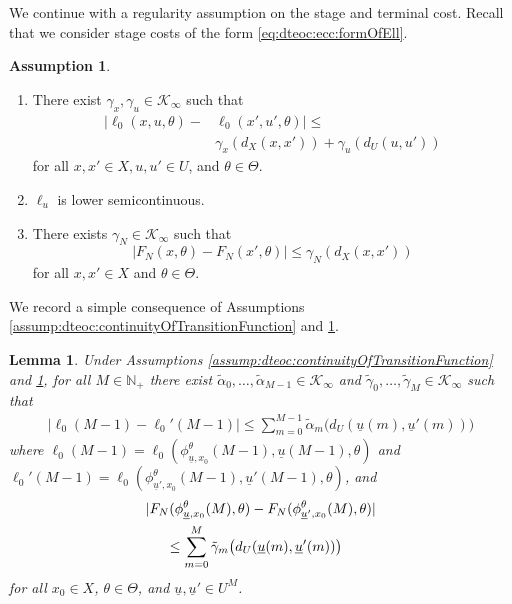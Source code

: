 \documentclass[letterpaper, 10 pt, conference]{IEEEconf}  %
\newcommand{\Np}{\mathbb{N}_+} %
\newcommand{\cKi}{\mathcal{K}_\infty} %
\newcommand{\s}{\phi} %
\newcommand{\is}[1]{{\underline{#1}}} %
\theoremstyle{theorem}
\newtheorem{lemma}[theorem]{Lemma}
\theoremstyle{definition}
\newtheorem{assumption}{Assumption}
\theoremstyle{remark}
\begin{document}
We continue with a regularity assumption on the stage and terminal cost.
Recall that we consider stage costs of the form \eqref{eq:dteoc:ecc:formOfEll}.
\begin{assumption} \label{assump:dteoc:continuityOfLossFunction}
\begin{enumerate}
    \item There exist $\gamma_x,\gamma_u\in\cKi$ such that
        \begin{equation}
        \begin{split}
            |\ell_0(x,u,\theta)-  & \ell_0(x',u',\theta)| \leq \\
            &\gamma_x(d_X(x,x')) + \gamma_u(d_U(u,u'))
        \end{split}
        \end{equation}
        for all $x,x' \in X, u,u' \in U$, and $\theta \in \Theta$.
    \item $\ell_u$ is lower semicontinuous.
    \item There exists $\gamma_N\in\cKi$ such that
        \begin{equation}
            |F_N(x,\theta)-F_N(x',\theta)| \leq \gamma_N(d_X(x,x'))
        \end{equation}
        for all $x,x'\in X$ and $\theta\in\Theta$.
\end{enumerate}
\end{assumption}
We record a simple consequence of Assumptions \ref{assump:dteoc:continuityOfTransitionFunction} and \ref{assump:dteoc:continuityOfLossFunction}.
\begin{lemma} \label{lem:dteoc:ecc:continuityCosts}
Under Assumptions \ref{assump:dteoc:continuityOfTransitionFunction} and \ref{assump:dteoc:continuityOfLossFunction},
for all $M\in\Np$ there exist $\tilde\alpha_0,\ldots,\tilde\alpha_{M-1}\in\cKi$ and $\tilde\gamma_0,\ldots,\tilde\gamma_M\in\cKi$ such that {\small
\begin{align} \label{eq:ecc:continuityStageCosts}
    |\ell_0(M-1) - \ell_0'(M-1)| \leq \sum_{m=0}^{M-1} \tilde\alpha_m\big(d_U(\is{u}(m),\is{u}'(m))\big)
\end{align} }
where $\ell_0(M-1) = \ell_0(\s_{\is{u},x_0}^\theta(M-1),\is{u}(M-1),\theta)$ and $\ell_0'(M-1)=\ell_0(\s_{\is{u}',x_0}^\theta(M-1),\is{u}'(M-1),\theta)$,
and
\begin{align} \label{eq:ecc:continuityFinalCost}
    & |F_N(\s_{\is{u},x_0}^\theta(M),\theta) - F_N(\s_{\is{u}',x_0}^\theta(M),\theta)| \nonumber \\
    & \hspace{0.5cm} \leq \sum_{m=0}^{M} \tilde\gamma_m\big(d_U(\is{u}(m),\is{u}'(m))\big)
\end{align}
for all $x_0\in X$, $\theta \in \Theta$, and $\is{u},\is{u}'\in U^M$.
\end{lemma}
\end{document}
